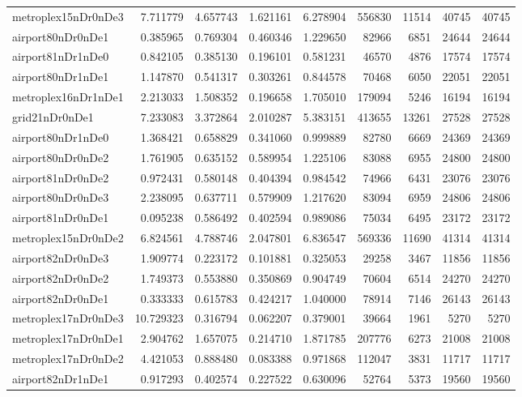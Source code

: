 \documentclass[../../../thesis.tex]{subfiles}
\begin{document}
\begin{longtable}{|l|r|r|r|r|r|r|r|r|}
metroplex15nDr0nDe3 & 7.711779 & 4.657743 & 1.621161 & 6.278904 & 556830 & 11514 & 40745 & 40745 \\
airport80nDr0nDe1 & 0.385965 & 0.769304 & 0.460346 & 1.229650 & 82966 & 6851 & 24644 & 24644 \\
airport81nDr1nDe0 & 0.842105 & 0.385130 & 0.196101 & 0.581231 & 46570 & 4876 & 17574 & 17574 \\
airport80nDr1nDe1 & 1.147870 & 0.541317 & 0.303261 & 0.844578 & 70468 & 6050 & 22051 & 22051 \\
metroplex16nDr1nDe1 & 2.213033 & 1.508352 & 0.196658 & 1.705010 & 179094 & 5246 & 16194 & 16194 \\
grid21nDr0nDe1 & 7.233083 & 3.372864 & 2.010287 & 5.383151 & 413655 & 13261 & 27528 & 27528 \\
airport80nDr1nDe0 & 1.368421 & 0.658829 & 0.341060 & 0.999889 & 82780 & 6669 & 24369 & 24369 \\
airport80nDr0nDe2 & 1.761905 & 0.635152 & 0.589954 & 1.225106 & 83088 & 6955 & 24800 & 24800 \\
airport81nDr0nDe2 & 0.972431 & 0.580148 & 0.404394 & 0.984542 & 74966 & 6431 & 23076 & 23076 \\
airport80nDr0nDe3 & 2.238095 & 0.637711 & 0.579909 & 1.217620 & 83094 & 6959 & 24806 & 24806 \\
airport81nDr0nDe1 & 0.095238 & 0.586492 & 0.402594 & 0.989086 & 75034 & 6495 & 23172 & 23172 \\
metroplex15nDr0nDe2 & 6.824561 & 4.788746 & 2.047801 & 6.836547 & 569336 & 11690 & 41314 & 41314 \\
airport82nDr0nDe3 & 1.909774 & 0.223172 & 0.101881 & 0.325053 & 29258 & 3467 & 11856 & 11856 \\
airport82nDr0nDe2 & 1.749373 & 0.553880 & 0.350869 & 0.904749 & 70604 & 6514 & 24270 & 24270 \\
airport82nDr0nDe1 & 0.333333 & 0.615783 & 0.424217 & 1.040000 & 78914 & 7146 & 26143 & 26143 \\
metroplex17nDr0nDe3 & 10.729323 & 0.316794 & 0.062207 & 0.379001 & 39664 & 1961 & 5270 & 5270 \\
metroplex17nDr0nDe1 & 2.904762 & 1.657075 & 0.214710 & 1.871785 & 207776 & 6273 & 21008 & 21008 \\
metroplex17nDr0nDe2 & 4.421053 & 0.888480 & 0.083388 & 0.971868 & 112047 & 3831 & 11717 & 11717 \\
airport82nDr1nDe1 & 0.917293 & 0.402574 & 0.227522 & 0.630096 & 52764 & 5373 & 19560 & 19560 \\

\end{longtable}
\end{document}
